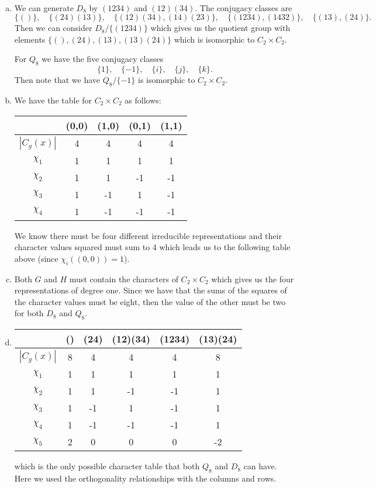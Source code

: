 \documentclass[leqno]{article}
\begin{document}
\begin{solution}~
\begin{enumerate}[(a)]
    \item We can generate $D_8$ by $(1234)$ and $(12)(34)$.  The conjugacy classes are
    \[
    \{()\},\quad \{(24)(13)\},\quad \{(12)(34),(14)(23)\},\quad \{(1234),(1432)\},\quad \{(13),(24)\}.
    \]
    Then we can consider $D_8/\{(1234)\}$ which gives us the quotient group with elements $\{(),(24),(13),(13)(24)\}$ which is isomorphic to $C_2\times C_2$.
    
    For $Q_8$ we have the five conjugacy classes
    \[
    \{1\},\quad \{-1\}, \quad \{i\}, \quad \{j\}, \quad \{k\}.
    \]
    Then note that we have $Q_8/\{-1\}$ is isomorphic to $C_2\times C_2$.
    \item We have the table for $C_2\times C_2$ as follows:
    \begin{tabular}{c|cccc}
        ~ & (0,0) & (1,0) & (0,1) & (1,1)\\
        \hline
        $|C_g(x)|$ & 4 & 4 & 4 & 4\\
        $\chi_1$ & 1 & 1 & 1 & 1\\
        $\chi_2$ & 1 & 1 & -1 & -1\\
        $\chi_3$ & 1 & -1 & 1 & -1 \\
        $\chi_4$ & 1 & -1 & -1 & -1
    \end{tabular}
    We know there must be four different irreducible representations and their character values squared must sum to 4 which leads us to the following table above (since $\chi_i((0,0))=1$).
    \item Both $G$ and $H$ must contain the characters of $C_2\times C_2$ which gives us the four representations of degree one.  Since we have that the sums of the squares of the character values must be eight, then the value of the other must be two for both $D_8$ and $Q_8$.  
    \item     \begin{tabular}{c|ccccc}
        ~ & () & (24) & (12)(34) & (1234) & (13)(24)\\
        \hline
        $|C_g(x)|$ & 8 & 4 & 4 & 4 & 8\\
        $\chi_1$ & 1 & 1 & 1 & 1 & 1\\
        $\chi_2$ & 1 & 1 & -1 & -1 & 1\\
        $\chi_3$ & 1 & -1 & 1 & -1 & 1 \\
        $\chi_4$ & 1 & -1 & -1 & -1 & 1\\
        $\chi_5$ & 2 & 0 & 0 & 0 & -2 
    \end{tabular}
    which is the only possible character table that both $Q_8$ and $D_8$ can have. Here we used the orthogonality relationships with the columns and rows.
\end{enumerate}
\end{solution}
\end{document}
